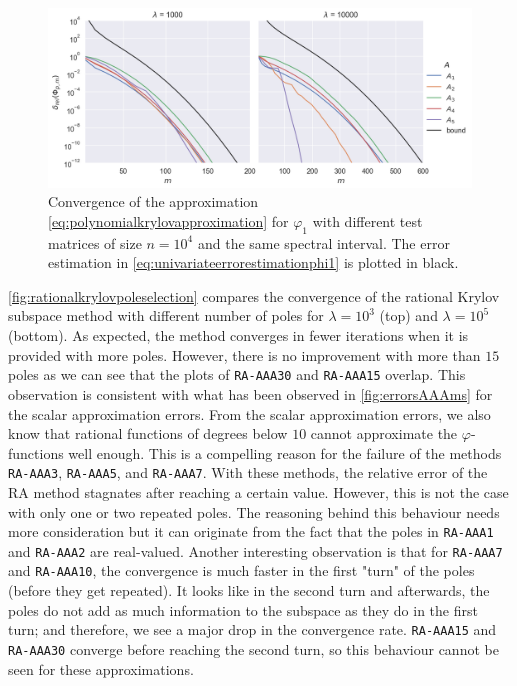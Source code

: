 \begin{figure}[h]
    \centering
    \includegraphics[width=.9\textwidth]{img/krylovapproximation/cnvg_matrices_PA_n10000.png}
    \caption{Convergence of the approximation \eqref{eq:polynomialkrylovapproximation}
    for $\varphi_1$ with different test matrices of size $n=10^4$ and the same spectral interval.
    The error estimation in \eqref{eq:univariateerrorestimationphi1} is plotted in black.}
    \label{fig:krylovapproximationmatrices}
\end{figure}

\autoref{fig:rationalkrylovpoleselection} compares the convergence of the
rational Krylov subspace method with different number of poles for $\lambda=10^3$ (top)
and $\lambda=10^5$ (bottom).
As expected, the method converges in fewer iterations when it is provided with more poles.
However, there is no improvement with more than $15$ poles as we can see that the plots of
\texttt{RA-AAA30} and \texttt{RA-AAA15} overlap. This observation is consistent with what
has been observed in \autoref{fig:errorsAAAms} for the scalar approximation errors.
From the scalar approximation errors, we also know that rational functions of degrees below
$10$ cannot approximate the $\varphi$-functions well enough. This is a compelling reason
for the failure of the methods \texttt{RA-AAA3}, \texttt{RA-AAA5}, and \texttt{RA-AAA7}.
With these methods, the relative error of the RA method stagnates after reaching a certain
value. However, this is not the case with only one or two repeated poles. The reasoning behind
this behaviour needs more consideration but it can originate from the fact that the poles
in \texttt{RA-AAA1} and \texttt{RA-AAA2} are real-valued.
Another interesting observation is that for \texttt{RA-AAA7} and \texttt{RA-AAA10}, the convergence
is much faster in the first "turn" of the poles (before they get repeated). It looks like
in the second turn and afterwards, the poles do not add as much information to the subspace
as they do in the first turn; and therefore, we see a major drop in the convergence rate.
\texttt{RA-AAA15} and \texttt{RA-AAA30} converge before reaching the second turn, so this
behaviour cannot be seen for these approximations.

